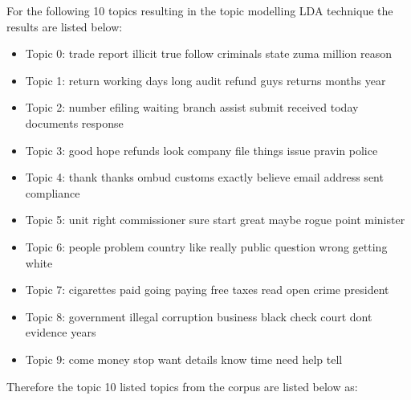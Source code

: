 For the following 10 topics resulting in the topic modelling LDA technique the results are listed below:

\begin{itemize}
    \item Topic 0: trade report illicit true follow criminals state zuma million reason
\end{itemize}
\begin{itemize}
    \item Topic 1: return working days long audit refund guys returns months year
\end{itemize}
\begin{itemize}
    \item Topic 2: number efiling waiting branch assist submit received today documents response
\end{itemize}
\begin{itemize}
    \item Topic 3: good hope refunds look company file things issue pravin police
\end{itemize}
\begin{itemize}
    \item Topic 4: thank thanks ombud customs exactly believe email address sent compliance
\end{itemize}
\begin{itemize}
    \item Topic 5: unit right commissioner sure start great maybe rogue point minister
\end{itemize}
\begin{itemize}
    \item Topic 6: people problem country like really public question wrong getting white
\end{itemize}
\begin{itemize}
    \item Topic 7: cigarettes paid going paying free taxes read open crime president
\end{itemize}
\begin{itemize}
    \item Topic 8: government illegal corruption business black check court dont evidence years
\end{itemize}
\begin{itemize}
    \item Topic 9: come money stop want details know time need help tell
\end{itemize}

Therefore the topic 10 listed topics from the corpus are listed below as:

